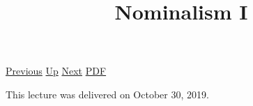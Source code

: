\documentclass[12pt,a4paper]{report}
\begin{document}
 \href{doc/phil/People/Brandom/OnSellars/2019/Introduction.html}{Previous} 
 \href{doc/phil/People/Brandom/OnSellars/2019.html}{Up} 
 \href{doc/phil/People/Brandom/OnSellars/2019/NominalismII.html}{Next} 
 \href{doc/phil/People/Brandom/OnSellars/2019/NominalismI.pdf}{PDF} 
\title{Nominalism I}

\tableofcontents
This lecture was delivered on October 30, 2019.
\end{document}
